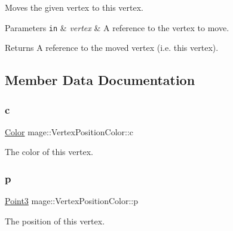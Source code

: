Moves the given vertex to this vertex.


\begin{DoxyParams}[1]{Parameters}
\mbox{\tt in}  & {\em vertex} & A reference to the vertex to move. \\
\hline
\end{DoxyParams}
\begin{DoxyReturn}{Returns}
A reference to the moved vertex (i.\+e. this vertex). 
\end{DoxyReturn}


\subsection{Member Data Documentation}
\hypertarget{structmage_1_1_vertex_position_color_a4a9e50e66f73e93a9a529c0c940e2458}{}\label{structmage_1_1_vertex_position_color_a4a9e50e66f73e93a9a529c0c940e2458} 
\subsubsection{\texorpdfstring{c}{c}}
{\footnotesize\ttfamily \hyperlink{structmage_1_1_color}{Color} mage\+::\+Vertex\+Position\+Color\+::c}

The color of this vertex. \hypertarget{structmage_1_1_vertex_position_color_afe40a78afb8e13e742d93d5092b1a614}{}\label{structmage_1_1_vertex_position_color_afe40a78afb8e13e742d93d5092b1a614} 
\subsubsection{\texorpdfstring{p}{p}}
{\footnotesize\ttfamily \hyperlink{structmage_1_1_point3}{Point3} mage\+::\+Vertex\+Position\+Color\+::p}

The position of this vertex. \hypertarget{structmage_1_1_vertex_position_color_a0cc09950718850b64339c5fd5130ff9a}{}\label{structmage_1_1_vertex_position_color_a0cc09950718850b64339c5fd5130ff9a} 
